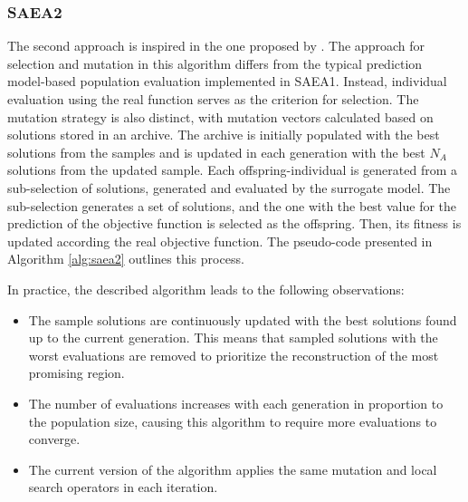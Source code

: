 			\subsubsection{SAEA2}\label{chap:proposed-methodology:surrogate:algorithms:saea2}
				
				The second approach is inspired in the one proposed by \cite{valadao2020comparative}. The approach for selection and mutation in this algorithm differs from the typical prediction model-based population evaluation implemented in SAEA1. Instead, individual evaluation using the real function serves as the criterion for selection. The mutation strategy is also distinct, with mutation vectors calculated based on solutions stored in an archive. The archive is initially populated with the best solutions from the samples and is updated in each generation with the best $N_A$ solutions from the updated sample. Each offspring-individual is generated from a sub-selection of solutions, generated and evaluated by the surrogate model. The sub-selection generates a set of solutions, and the one with the best value for the prediction of the objective function is selected as the offspring. Then, its fitness is updated according the real objective function. The pseudo-code presented in Algorithm \ref{alg:saea2} outlines this process.
				
				In practice, the described algorithm leads to the following observations:
				\begin{itemize}
					\item The sample solutions are continuously updated with the best solutions found up to the current generation. This means that sampled solutions with the worst evaluations are removed to prioritize the reconstruction of the most promising region.
					\item The number of evaluations increases with each generation in proportion to the population size, causing this algorithm to require more evaluations to converge.
					\item The current version of the algorithm applies the same mutation and local search operators in each iteration.
				\end{itemize}
    
